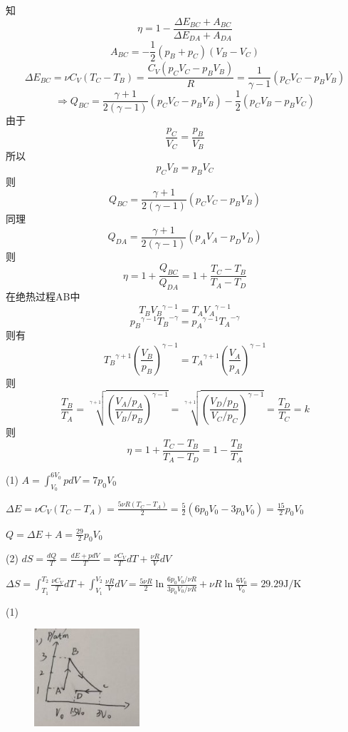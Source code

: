 \documentclass[b5paper,opensource]{./template/qyxf-book}
\begin{document}
知\[\eta  = 1 - \frac{{\Delta {E_{BC}} + {A_{BC}}}}{{\Delta {E_{DA}} + A{  _{DA}}}}\]
\[{A_{BC}} =  - \frac{1}{2}({p_B} + {p_C})({V_B} - {V_C})\]
\[\Delta {E_{BC}} = \nu {C_V}({T_C} - {T_B}) = \frac{{{C_V}({p_C}{V_C} - {p_B}{V_B})}}{R} = \frac{1}{{\gamma  - 1}}({p_C}{V_C} - {p_B}{V_B})\]
\[ \Rightarrow {Q_{BC}} = \frac{{\gamma  + 1}}{{2(\gamma  - 1)}}({p_C}{V_C} - {p_B}{V_B}) - \frac{1}{2}({p_C}{V_B} - {p_B}{V_C})\]
由于\[\frac{{{p_C}}}{{{V_C}}} = \frac{{{p_B}}}{{{V_B}}}\]
所以\[{p_C}{V_B} = {p_B}{V_C}\]
则\[{Q_{BC}} = \frac{{\gamma  + 1}}{{2(\gamma  - 1)}}({p_C}{V_C} - {p_B}{V_B})\]
同理\[{Q_{DA}} = \frac{{\gamma  + 1}}{{2(\gamma  - 1)}}({p_A}{V_A} - {p_D}{V_D})\]
则\[\eta  = 1 + \frac{{{Q_{BC}}}}{{{Q_{DA}}}} = 1 + \frac{{{T_C} - {T_B}}}{{{T_A} - {T_D}}}\]
在绝热过程AB中\[{T_B}{V_B}^{\gamma  - 1} = {T_A}{V_A}^{\gamma  - 1}\]
\[{p_B}^{\gamma  - 1}{T_B}^{ - \gamma } = {p_A}^{\gamma  - 1}{T_A}^{ - \gamma }\]
则有\[{T_B}^{\gamma  + 1}{(\frac{{{V_B}}}{{{p_B}}})^{\gamma  - 1}} = {T_A}^{\gamma  + 1}{(\frac{{{V_A}}}{{{p_A}}})^{\gamma  - 1}}\]
则\[\frac{{{T_B}}}{{{T_A}}} = \sqrt[{\gamma+1}]{{{{\left(\frac{V_A/p_A}{V_B/p_B}\right)}^{\gamma  - 1}}}} = \sqrt[{\gamma  + 1}]{{{{\left(\frac{V_D/p_D}{V_C/p_C}\right)}^{\gamma-1}}}} = \frac{{{T_D}}}{{{T_C}}}=k\]
则\[\eta  = 1 + \frac{T_C-T_B}{T_A-T_D} = 1 - \frac{T_B}{T_A}\]


\solve

(1)
$A = \int_{{V_0}}^{6{V_0}} pdV=7{p_0}{V_0}$

$\Delta E = \nu {C_V}({T_C} - {T_A}) = \frac{{5\nu R({T_C} - {T_A})}}{2} = \frac{5}{2}(6{p_0}{V_0} - 3{p_0}{V_0}) = \frac{{15}}{2}{p_0}{V_0}$

$Q = \Delta E + A = \frac{{29}}{2}{p_0}{V_0}$

(2)
$dS = \frac{{dQ}}{T} = \frac{{dE + pdV}}{T} = \frac{{\nu {C_V}}}{T}dT + \frac{{\nu R}}{V}dV$

\therefore $ \Delta S = \int_{{T_1}}^{{T_2}} {\frac{{\nu {C_V}}}{T}dT + \int_{{V_1}}^{{V_2}} {\frac{{\nu R}}{V}dV}  = } \frac{{5\nu R}}{2}\ln \frac{{6{p_0}{V_0}/\nu R}}{{3{p_0}{V_0}/\nu R}} + \nu R\ln \frac{{6{V_0}}}{{{V_0}}} = 29.29\mathrm{J/K}$


\solve
(1)
\begin{figure}[!h]
	\centering
	\includegraphics[width=0.35\textwidth]{1.jpeg}
\end{figure}
\end{document}
